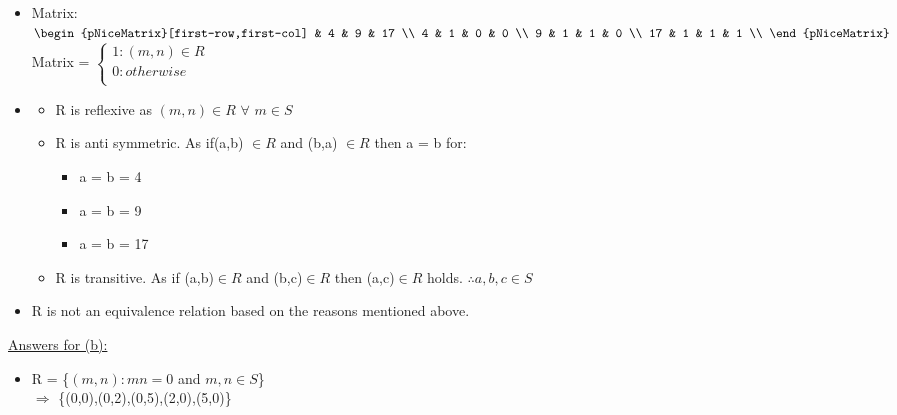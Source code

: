 \documentclass{article}
\begin{document}
\begin{enumerate}
\begin{itemize}
    \item Matrix:\\
        $\begin{pNiceMatrix}[first-row,first-col]
        & 4 & 9 & 17       \\
        4  & 1 & 0 & 0        \\ 
        9  & 1 & 1 & 0        \\
        17 & 1 & 1 & 1        \\
        \end{pNiceMatrix}$
        \hspace{1cm} Matrix = 
        $\begin{cases}
            1: (m,n)\in R\\
            0: otherwise\\  
        \end{cases}$ \\
    
    \item \begin{itemize}
       \item R is reflexive as $(m,n) \in R$ $\forall$ $m \in S$
       \item R is anti symmetric. As if(a,b) $\in R$ and (b,a) $\in R$ then a = b for: 
        \begin{itemize}
            \item[] a = b = 4 
            \item[] a = b = 9 
            \item[] a = b = 17
        \end{itemize}
        \item R is transitive. As if (a,b)$\in R$ and (b,c)$\in R$ then (a,c)$\in R$ holds. $\therefore a,b,c \in S$  
     \end{itemize}
    \item R is not an equivalence relation based on the reasons mentioned above.
    
\end{itemize}

\pagebreak %

\underline{Answers for (b):}    

\begin{itemize}
    \item R = \{$(m,n):mn = 0$ and $m,n \in S$\}
    \\$\Rightarrow$ \{(0,0),(0,2),(0,5),(2,0),(5,0)\}\\


\end{itemize}
\end{enumerate}
\end{document}
